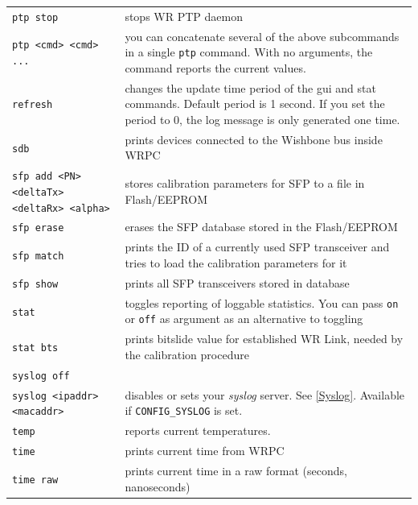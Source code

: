 \documentclass[a4paper, 12pt]{article}
\newcommand{\code}[1]{\texttt{#1}}
\begin{document}
\begin{longtable}{  p{7.5cm}  p{7cm} }
  \code{ptp stop} & stops WR PTP daemon \\

  \code{ptp <cmd> <cmd> ...} & you can concatenate several of the above
    subcommands in a single \texttt{ptp} command. With no arguments,
    the command reports the current values.\\

  \code{refresh} & changes the update time period of the gui and stat commands.
    Default period is 1 second. If you set the period to 0, the log message is
    only generated one time. \\

  \code{sdb} & prints devices connected to the Wishbone bus inside WRPC \\

  \code{sfp add <PN> <deltaTx> <deltaRx> <alpha>} & stores calibration
    parameters for SFP to a file in Flash/EEPROM \\

  \code{sfp erase} & erases the SFP database stored in the Flash/EEPROM \\

  \code{sfp match} & prints the ID of a currently used SFP transceiver and
    tries to load the calibration parameters for it \\

  \code{sfp show} & prints all SFP transceivers stored in database \\

  \code{stat} & toggles reporting of loggable statistics. You can pass
    \texttt{on} or \texttt{off} as argument as an alternative to toggling \\

  \code{stat bts} & prints bitslide value for established WR Link, needed by
    the calibration procedure \\

  \code{syslog off} &  \\
  \code{syslog <ipaddr> <macaddr>} & disables or sets your \textit{syslog}
    server. See \ref{Syslog}. Available if \texttt{CONFIG\_SYSLOG} is set. \\

  \code{temp} & reports current temperatures. \\

  \code{time} & prints current time from WRPC \\

  \code{time raw} &  prints current time in a raw format (seconds, nanoseconds) \\


\end{longtable}
\end{document}
